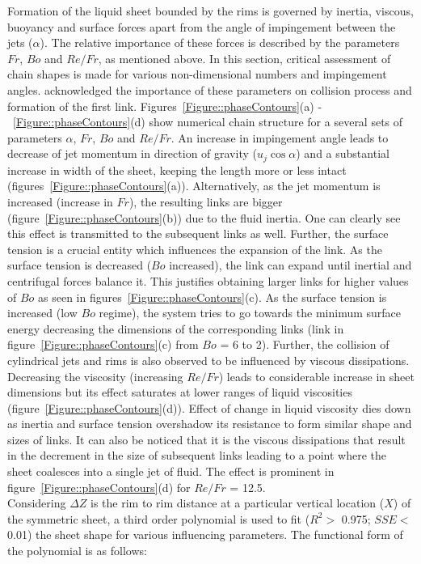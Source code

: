 \documentclass[%
 aip,
 sd,%
amsmath,amssymb,
preprint,%
author-year,%
]{revtex4-1}
\begin{document}
Formation of the liquid sheet bounded by the rims is governed by inertia, viscous, buoyancy and surface forces apart from the angle of impingement between the jets ($\alpha$). The relative importance of these forces is described by the parameters $Fr$, $Bo$ and $Re/Fr$, as mentioned above. In this section, critical assessment of chain shapes is made for various non-dimensional numbers and impingement angles. \cite{yang2014liquid} acknowledged the importance of these parameters on collision process and formation of the first link. Figures~\ref{Figure::phaseContours}(a) -~\ref{Figure::phaseContours}(d) show numerical chain structure for a several sets of parameters $\alpha$, $Fr$, $Bo$ and $Re/Fr$. An increase in impingement angle leads to decrease of jet momentum in direction of gravity ($u_j\cos\alpha$) and a substantial increase in width of the sheet, keeping the length more or less intact (figures~\ref{Figure::phaseContours}(a)). Alternatively, as the jet momentum is increased (increase in $Fr$), the resulting links are bigger (figure~\ref{Figure::phaseContours}(b)) due to the fluid inertia. One can clearly see this effect is transmitted to the subsequent links as well. Further, the surface tension is a crucial entity which influences the expansion of the link. As the surface tension is decreased ($Bo$ increased), the link can expand until inertial and centrifugal forces balance it. This justifies obtaining larger links for higher values of $Bo$ as seen in figures~\ref{Figure::phaseContours}(c). As the surface tension is increased (low $Bo$ regime), the system tries to go towards the minimum surface energy decreasing the dimensions of the corresponding links (link in figure~\ref{Figure::phaseContours}(c) from $Bo$ = 6 to 2). Further, the collision of cylindrical jets and rims is also observed to be influenced by viscous dissipations. Decreasing the viscosity (increasing $Re/Fr$) leads to considerable increase in sheet dimensions but its effect saturates at lower ranges of liquid viscosities (figure~\ref{Figure::phaseContours}(d)). Effect of change in liquid viscosity dies down as inertia and surface tension overshadow its resistance to form similar shape and sizes of links. It can also be noticed that it is the viscous dissipations that result in the decrement in the size of subsequent links leading to a point where the sheet coalesces into a single jet of fluid. The effect is prominent in figure~\ref{Figure::phaseContours}(d) for $Re/Fr$ = 12.5.\\
Considering $\Delta Z$ is the rim to rim distance at a particular vertical location ($X$) of the symmetric sheet, a third order polynomial is used to fit ($R^2 >$ 0.975; $SSE <$ 0.01) the sheet shape for various influencing parameters. The functional form of the polynomial is as follows: 
\end{document}
